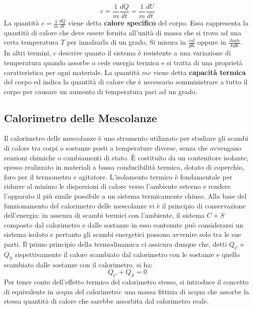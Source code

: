 \begin{equation}
	c = \frac{1}{m}\frac{dQ}{dt} = \frac{1}{m}\frac{dU}{dt}
\end{equation}
La quantità $c = \frac{1}{m}\frac{dQ}{dt}$ viene detta \textbf{calore specifico} del corpo. Essa rappresenta la quantità di calore che deve essere fornita all'unità di massa che si trova ad una certa temperatura $T$ per innalzarla di un grado. Si misura in $\frac{cal}{g \mathrm{K}}$ oppure in $\frac{Joule}{kg \mathrm{K}}$. In altri termini, $c$ descrive quanto il sistema è resistente a una variazione di temperatura quando assorbe o cede energia termica e si tratta di una proprietà caratteristica per ogni materiale. La quantità $mc$ viene detta \textbf{capacità termica} del corpo ed indica la quantità di calore che è necessario somministrare a tutto il corpo per causare un aumento di temperatura pari ad un grado.

\subsection{Calorimetro delle Mescolanze}
Il calorimetro delle mescolanze è uno strumento utilizzato per studiare gli scambi di calore tra corpi o sostanze posti a temperature diverse, senza che avvengano reazioni chimiche o cambiamenti di stato. È costituito da un contenitore isolante, spesso realizzato in materiali a bassa conducibilità termica, dotato di coperchio, foro per il termometro e agitatore. L'isolamento termico è fondamentale per ridurre al minimo le dispersioni di calore verso l'ambiente esterno e rendere l'apparato il più simile possibile a un sistema termicamente chiuso. Alla base del funzionamento del calorimetro delle mescolanze vi è il principio di conservazione dell'energia: in assenza di scambi termici con l'ambiente, il sistema $C+S$ composto dal calorimetro e dalle sostanze in esso contenute può considerarsi un sistema isolato e pertanto gli scambi energetici possono avvenire solo tra le sue parti. Il primo principio della termodinamica ci assicura dunque che, detti $Q_{C}$ e $Q_S$ rispettivamente il calore scambiato dal calorimetro con le sostanze e quello scambiato dalle sostanze con il calorimetro, si ha:
\begin{equation}
	Q_{C} + Q_{S} = 0
\end{equation}
Per tener conto dell'effetto termico del calorimetro stesso, si introduce il concetto di equivalente in acqua del calorimetro: una massa fittizia di acqua che assorbe la stessa quantità di calore che sarebbe assorbita dal calorimetro reale.



